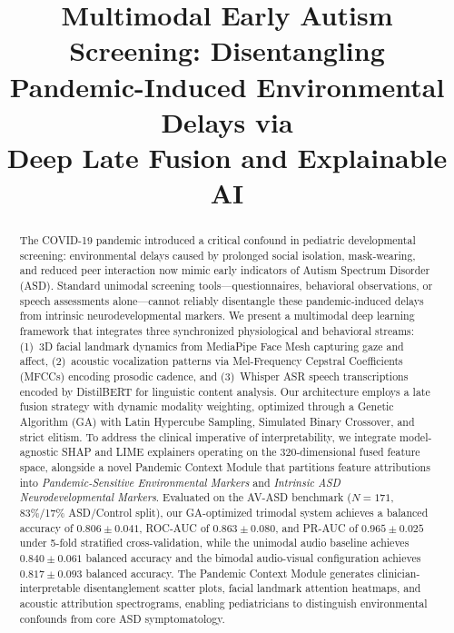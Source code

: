 \documentclass[conference]{IEEEtran}
\title{Multimodal Early Autism Screening: Disentangling\\Pandemic-Induced Environmental Delays via\\Deep Late Fusion and Explainable AI}
\author{
\IEEEauthorblockN{Sagnik (First Author)}
\IEEEauthorblockA{
Department of Computer Science\\
\textit{University Affiliation}\\
Email: sagnik@university.edu}
}
\begin{document}
\maketitle

\begin{abstract}
The COVID-19 pandemic introduced a critical confound in pediatric developmental screening: environmental delays caused by prolonged social isolation, mask-wearing, and reduced peer interaction now mimic early indicators of Autism Spectrum Disorder (ASD). Standard unimodal screening tools---questionnaires, behavioral observations, or speech assessments alone---cannot reliably disentangle these pandemic-induced delays from intrinsic neurodevelopmental markers. We present a multimodal deep learning framework that integrates three synchronized physiological and behavioral streams: (1)~3D facial landmark dynamics from MediaPipe Face Mesh capturing gaze and affect, (2)~acoustic vocalization patterns via Mel-Frequency Cepstral Coefficients (MFCCs) encoding prosodic cadence, and (3)~Whisper ASR speech transcriptions encoded by DistilBERT for linguistic content analysis. Our architecture employs a late fusion strategy with dynamic modality weighting, optimized through a Genetic Algorithm (GA) with Latin Hypercube Sampling, Simulated Binary Crossover, and strict elitism. To address the clinical imperative of interpretability, we integrate model-agnostic SHAP and LIME explainers operating on the 320-dimensional fused feature space, alongside a novel Pandemic Context Module that partitions feature attributions into \textit{Pandemic-Sensitive Environmental Markers} and \textit{Intrinsic ASD Neurodevelopmental Markers}. Evaluated on the AV-ASD benchmark ($N=171$, 83\%/17\% ASD/Control split), our GA-optimized trimodal system achieves a balanced accuracy of $0.806 \pm 0.041$, ROC-AUC of $0.863 \pm 0.080$, and PR-AUC of $0.965 \pm 0.025$ under 5-fold stratified cross-validation, while the unimodal audio baseline achieves $0.840 \pm 0.061$ balanced accuracy and the bimodal audio-visual configuration achieves $0.817 \pm 0.093$ balanced accuracy. The Pandemic Context Module generates clinician-interpretable disentanglement scatter plots, facial landmark attention heatmaps, and acoustic attribution spectrograms, enabling pediatricians to distinguish environmental confounds from core ASD symptomatology.
\end{abstract}
\end{document}
